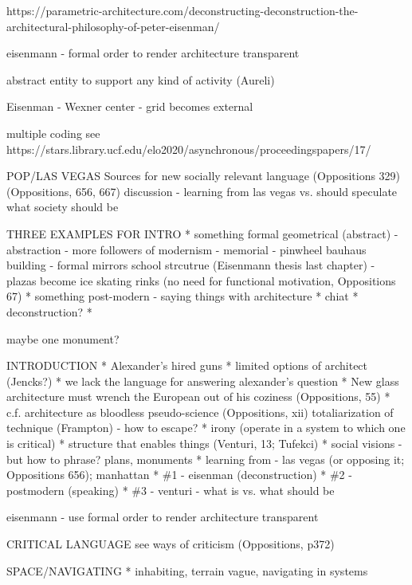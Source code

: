 https://parametric-architecture.com/deconstructing-deconstruction-the-architectural-philosophy-of-peter-eisenman/

eisenmann - formal order to render architecture transparent

abstract entity to support any kind of activity (Aureli)

Eisenman - Wexner center - grid becomes external

multiple coding see
https://stars.library.ucf.edu/elo2020/asynchronous/proceedingspapers/17/


POP/LAS VEGAS
Sources for new socially relevant language (Oppositions 329)
(Oppositions, 656,  667)
discussion - learning from las vegas
vs. should speculate what society should be


THREE EXAMPLES FOR INTRO
* something formal geometrical (abstract)
  - abstraction
  - more followers of modernism
  - memorial
  - pinwheel bauhaus building - formal mirrors school strcutrue (Eisenmann thesis last chapter)
  - plazas become ice skating rinks (no need for functional motivation, Oppositions 67)
* something post-modern - saying things with architecture
* chiat
* deconstruction?
*


maybe one monument?

INTRODUCTION
* Alexander's hired guns
* limited options of architect (Jencks?)
* we lack the language for answering alexander's question
* New glass architecture must wrench the European out of his coziness (Oppositions, 55)
* c.f. architecture as bloodless pseudo-science (Oppositions, xii)
  totaliarization of technique (Frampton) - how to escape?
* irony (operate in a system to which one is critical)
* structure that enables things (Venturi, 13; Tufekci)
* social visions - but how to phrase? plans, monuments
* learning from - las vegas (or opposing it; Oppositions 656); manhattan
* \#1 - eisenman (deconstruction)
* \#2 - postmodern (speaking)
* \#3 - venturi - what is vs. what should be



eisenmann - use formal order to render architecture transparent

CRITICAL LANGUAGE
see ways of criticism (Oppositions, p372)

SPACE/NAVIGATING
* inhabiting, terrain vague, navigating in systems

